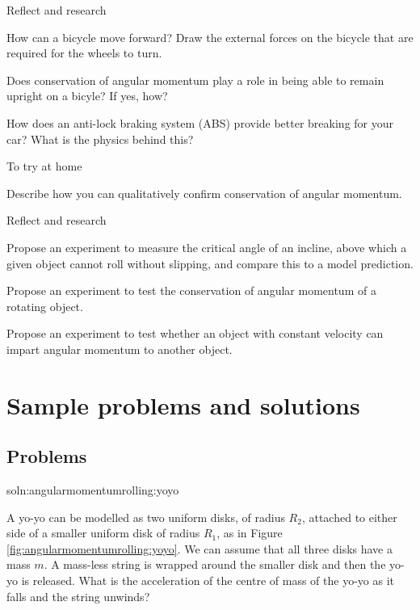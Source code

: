 \begin{chapteractivity}{Reflect and research}
{
\item How can a bicycle move forward? Draw the external forces on the bicycle that are required for the wheels to turn.
\item Does conservation of angular momentum play a role in being able to remain upright on a bicyle? If yes, how?
\item How does an anti-lock braking system (ABS) provide better breaking for your car? What is the physics behind this?
}
\end{chapteractivity}

\begin{chapteractivity}{To try at home}
{
\item Describe how you can qualitatively confirm conservation of angular momentum. 
}
\end{chapteractivity}

\begin{chapteractivity}{Reflect and research}
{
\item Propose an experiment to measure the critical angle of an incline, above which a given object cannot roll without slipping, and compare this to a model prediction.
\item Propose an experiment to test the conservation of angular momentum of a rotating object. 
\item Propose an experiment to test whether an object with constant velocity can impart angular momentum to another object.
}
\end{chapteractivity}


\newpage
\section{Sample problems and solutions}
\subsection{Problems}
\begin{problem}{soln:angularmomentumrolling:yoyo}{\label{prob:angularmomentumrolling:yoyo} A yo-yo can be modelled as two uniform disks, of radius $R_2$, attached to either side of a smaller uniform disk of radius $R_1$, as in Figure \ref{fig:angularmomentumrolling:yoyo}. We can assume that all three disks have a mass $m$. A mass-less string is wrapped around the smaller disk and then the yo-yo is released. What is the acceleration of the centre of mass of the yo-yo as it falls and the string unwinds?

}
\end{problem}

